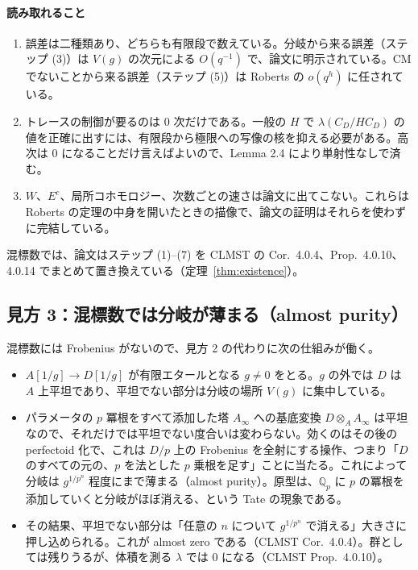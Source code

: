 \documentclass[11pt,a4paper]{ltjsarticle}
\numberwithin{equation}{section}
\theoremstyle{plain}
\theoremstyle{definition}
\theoremstyle{definition}
\begin{document}
\paragraph{読み取れること}
\begin{enumerate}
  \item 誤差は二種類あり、どちらも有限段で数えている。分岐から来る誤差（ステップ (3)）は $V(g)$ の次元による $O(q^{-1})$ で、論文に明示されている。CM でないことから来る誤差（ステップ (5)）は Roberts の $o(q^h)$ に任されている。
  \item トレースの制御が要るのは $0$ 次だけである。一般の $H$ で $\lambda(C_D/HC_D)$ の値を正確に出すには、有限段から極限への写像の核を抑える必要がある。高次は $0$ になることだけ言えばよいので、Lemma 2.4 により単射性なしで済む。
  \item $W$、$E^c$、局所コホモロジー、次数ごとの速さは論文に出てこない。これらは Roberts の定理の中身を開いたときの描像で、論文の証明はそれらを使わずに完結している。
\end{enumerate}
混標数では、論文はステップ (1)--(7) を CLMST の Cor.~4.0.4、Prop.~4.0.10、4.0.14 でまとめて置き換えている（定理~\ref{thm:existence}）。

\subsection{見方 3：混標数では分岐が薄まる（almost purity）}

混標数には Frobenius がないので、見方 2 の代わりに次の仕組みが働く。
\begin{itemize}
  \item $A[1/g]\to D[1/g]$ が有限エタールとなる $g\neq0$ をとる。$g$ の外では $D$ は $A$ 上平坦であり、平坦でない部分は分岐の場所 $V(g)$ に集中している。
  \item パラメータの $p$ 冪根をすべて添加した塔 $A_\infty$ への基底変換 $D\otimes_A A_\infty$ は平坦なので、それだけでは平坦でない度合いは変わらない。効くのはその後の perfectoid 化で、これは $D/p$ 上の Frobenius を全射にする操作、つまり「$D$ のすべての元の、$p$ を法とした $p$ 乗根を足す」ことに当たる。これによって分岐は $g^{1/p^n}$ 程度にまで薄まる（almost purity）。原型は、$\mathbb{Q}_p$ に $p$ の冪根を添加していくと分岐がほぼ消える、という Tate の現象である。
  \item その結果、平坦でない部分は「任意の $n$ について $g^{1/p^n}$ で消える」大きさに押し込められる。これが almost zero である（CLMST Cor.~4.0.4）。群としては残りうるが、体積を測る $\lambda$ では $0$ になる（CLMST Prop.~4.0.10）。
\end{itemize}
\end{document}
